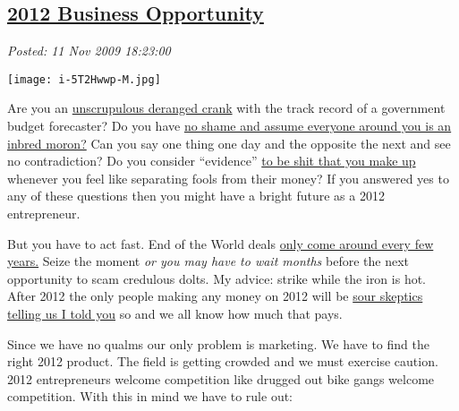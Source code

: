%

\subsection*{\href{http://bakerjd99.wordpress.com/2009/11/11/2012-business-opportunity/}{2012 Business Opportunity}}


\noindent\emph{Posted: 11 Nov 2009 18:23:00}
\vspace{6pt}


\captionsetup[floatingfigure]{labelformat=empty}
\begin{floatingfigure}[l]{0.30\textwidth}
\centering
\texttt{[image: i-5T2Hwwp-M.jpg]}
\label{fig:295X0}
\end{floatingfigure}Are
you an
\href{http://en.wikipedia.org/wiki/Richard\_C.\_Hoagland}{unscrupulous
deranged crank} with the track record of a government budget forecaster?
Do you have \href{http://www.bennyhinn.org/default.cfm}{no shame and
assume everyone around you is an inbred moron?} Can you say one thing
one day and the opposite the next and see no contradiction? Do you
consider ``evidence''
\href{http://blogcritics.org/scitech/article/is-science-just-another-opinion/}{to
be shit that you make up} whenever you feel like separating fools from
their money? If you answered yes to any of these questions then you
might have a bright future as a 2012 entrepreneur.

But you have to act fast. End of the World deals
\href{http://www.bible.ca/pre-date-setters.htm}{only come around every
few years.} Seize the moment \emph{or you may have to wait months}
before the next opportunity to scam credulous dolts. My advice: strike
while the iron is hot. After 2012 the only people making any money on
2012 will be
\href{http://www.skyandtelescope.com/news/64430612.html}{sour skeptics
telling us I told you} so and we all know how much that pays.

Since we have no qualms our only problem is marketing. We have to find
the right 2012 product. The field is getting crowded and we must
exercise caution. 2012 entrepreneurs welcome competition like drugged
out bike gangs welcome competition. With this in mind we have to rule
out:

